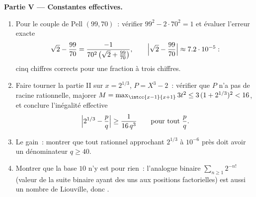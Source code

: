 \begin{problem}
\medskip
\noindent\textbf{Partie V --- Constantes effectives.}
\begin{enumerate}[resume]
  \item Pour le couple de Pell $(99, 70)$~: vérifier $99^2 - 2\cdot70^2
        = 1$ et évaluer l'erreur exacte
        \[
        \sqrt2 - \frac{99}{70}
        = \frac{-1}{70^2\,\bigl(\sqrt2 + \frac{99}{70}\bigr)},
        \qquad
        \Bigl|\sqrt 2 - \frac{99}{70}\Bigr| \approx 7.2\cdot
        10^{-5} :
        \]
        cinq chiffres corrects pour une fraction à trois chiffres.
  \item Faire tourner la partie II sur $x = 2^{1/3}$, $P = X^3 - 2$~: vérifier que $P$
        n'a pas de racine rationnelle, majorer $M = \max_{\intcc{x-1}{x+1}}
        3t^2 \leq 3\,(1 + 2^{1/3})^2 < 16$, et conclure l'inégalité
        effective
        \[
        \Bigl| 2^{1/3} - \frac pq \Bigr| \geq
        \frac{1}{16\,q^3} \qquad \text{pour tout } \frac pq .
        \]
  \item Le gain~: montrer que tout rationnel approchant $2^{1/3}$
        à $10^{-6}$ près doit avoir un dénominateur $q \geq 40$.
  \item Montrer que la base $10$ n'y est pour rien~: l'analogue
        binaire $\sum_{n\geq1} 2^{-n!}$ (valeur de la suite binaire
        ayant des uns aux positions factorielles) est aussi un nombre de
        Liouville, donc .
\end{enumerate}


\end{problem}
